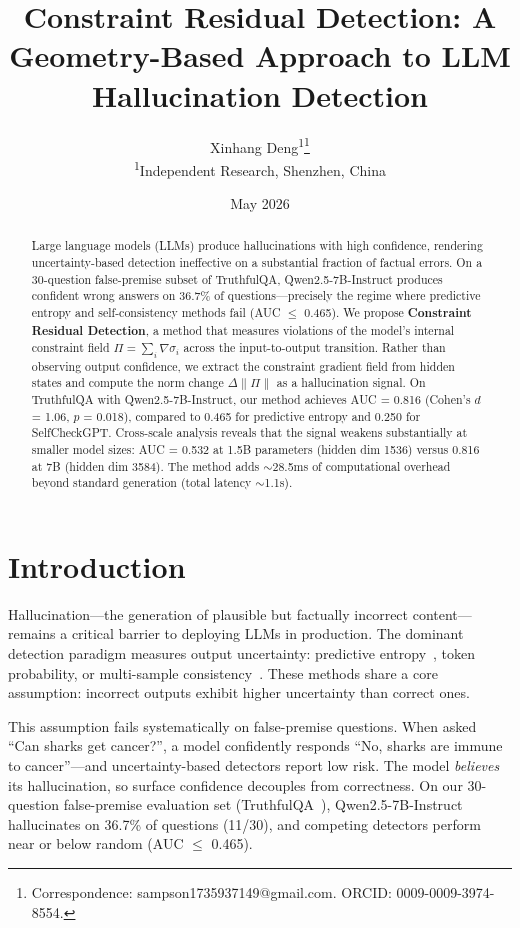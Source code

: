 \documentclass[11pt]{article}
\title{\textbf{Constraint Residual Detection: A Geometry-Based Approach to LLM Hallucination Detection}}
\author{
  Xinhang Deng\textsuperscript{1}\thanks{Correspondence: sampson1735937149@gmail.com. ORCID: 0009-0009-3974-8554.} \\
  \textsuperscript{1}Independent Research, Shenzhen, China \\
}
\date{May 2026}
\begin{document}
\maketitle

\begin{abstract}
Large language models (LLMs) produce hallucinations with high confidence, rendering uncertainty-based detection ineffective on a substantial fraction of factual errors. On a 30-question false-premise subset of TruthfulQA, Qwen2.5-7B-Instruct produces confident wrong answers on 36.7\% of questions---precisely the regime where predictive entropy and self-consistency methods fail (AUC $\leq$ 0.465). We propose \textbf{Constraint Residual Detection}, a method that measures violations of the model's internal constraint field $\Pi = \sum_i \nabla\sigma_i$ across the input-to-output transition. Rather than observing output confidence, we extract the constraint gradient field from hidden states and compute the norm change $\Delta\|\Pi\|$ as a hallucination signal. On TruthfulQA with Qwen2.5-7B-Instruct, our method achieves AUC = 0.816 (Cohen's $d$ = 1.06, $p$ = 0.018), compared to 0.465 for predictive entropy and 0.250 for SelfCheckGPT. Cross-scale analysis reveals that the signal weakens substantially at smaller model sizes: AUC = 0.532 at 1.5B parameters (hidden dim 1536) versus 0.816 at 7B (hidden dim 3584). The method adds $\sim$28.5ms of computational overhead beyond standard generation (total latency $\sim$1.1s).
\end{abstract}

\section{Introduction}

Hallucination---the generation of plausible but factually incorrect content---remains a critical barrier to deploying LLMs in production. The dominant detection paradigm measures output uncertainty: predictive entropy~\cite{kadavath2022language}, token probability, or multi-sample consistency~\cite{manakul2023selfcheckgpt,kuhn2023semantic}. These methods share a core assumption: incorrect outputs exhibit higher uncertainty than correct ones.

This assumption fails systematically on false-premise questions. When asked ``Can sharks get cancer?'', a model confidently responds ``No, sharks are immune to cancer''---and uncertainty-based detectors report low risk. The model \textit{believes} its hallucination, so surface confidence decouples from correctness. On our 30-question false-premise evaluation set (TruthfulQA~\cite{lin2022truthfulqa}), Qwen2.5-7B-Instruct hallucinates on 36.7\% of questions (11/30), and competing detectors perform near or below random (AUC $\leq$ 0.465).
\end{document}
